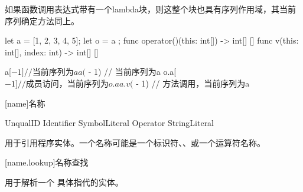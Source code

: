 \pnum
如果函数调用表达式带有一个lambda块，则这整个块也具有序列作用域，其当前序列确定方法同上。

\enterexample

\begin{codeblock}
let a = [1, 2, 3, 4, 5];
let o = { a };
func operator()(this: int[]) -> int[] { [] }
func v(this: int[], index: int) -> int[] { [] }

a[$ - 1] // 当前序列为a
a($ - 1) // 当前序列为a
o.a[$ - 1] // 成员访问，当前序列为o.a
a.v($ - 1) // 方法调用，当前序列为a

\end{codeblock}

\exitexample

[name]{名称}

\begin{bnf}{UnqualID}
    Identifier \br
    SymbolLiteral \br
     \br
     \br
     Operator \br
     StringLiteral \br
     \terminal{(} \terminal{)} \br
     \terminal{[} \terminal{]} \br
      \br
      \br
\end{bnf}

\pnum
{}用于引用程序实体。一个名称可能是一个标识符、、或一个运算符名称。

[name.lookup]{名称查找}

\pnum
{}用于解析一个  具体指代的实体。
